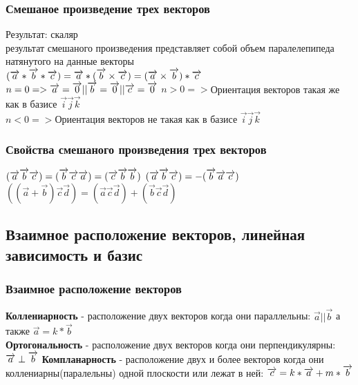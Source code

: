 \documentclass{article}
\begin{document}
\subsubsection{Смешаное произведение трех векторов}
Результат: скаляр\\
результат смешаного произведения представляет собой объем паралелепипеда натянутого на данные векторы\\ 
$(\overrightarrow{a}*\overrightarrow{b}*\overrightarrow{c})=\overrightarrow{a}*(\overrightarrow{b}\times\overrightarrow{c})=(\overrightarrow{a}\times\overrightarrow{b})*\overrightarrow{c}\\$
$n=0 => \overrightarrow{a}=\overrightarrow{0}||\overrightarrow{b}=\overrightarrow{0}||\overrightarrow{c}=\overrightarrow{0}\\$
$n>0 => $Ориентация векторов такая же как в базисе $\overrightarrow{i}\overrightarrow{j}\overrightarrow{k}$\\
$n<0 => $Ориентация векторов не такая как в базисе $\overrightarrow{i}\overrightarrow{j}\overrightarrow{k}$\\
\subsubsection{Свойства смешаного произведения трех векторов}
$(\overrightarrow{a}\overrightarrow{b}\overrightarrow{c})=(\overrightarrow{b}\overrightarrow{c}\overrightarrow{a})=(\overrightarrow{c}\overrightarrow{b}\overrightarrow{b})\\$
$(\overrightarrow{a}\overrightarrow{b}\overrightarrow{c})=-(\overrightarrow{b}\overrightarrow{a}\overrightarrow{c})\\$
$((\overrightarrow{a}+\overrightarrow{b})\overrightarrow{c}\overrightarrow{d})=(\overrightarrow{a}\overrightarrow{c}\overrightarrow{d})+(\overrightarrow{b}\overrightarrow{c}\overrightarrow{d})$
\subsection{Взаимное расположение векторов, линейная зависимость и базис}
\subsubsection{Взаимное расположение векторов}
\textbf{Коллениарность} - расположение двух векторов когда они параллельны: $\overrightarrow{a}||\overrightarrow{b}$ а также $\overrightarrow{a}=k*\overrightarrow{b}$\\
\textbf{Ортогональность} - расположение двух векторов когда они перпендикулярны: $\overrightarrow{a}\perp\overrightarrow{b}\\$
\textbf{Компланарность} - расположение двух и более векторов когда они коллениарны(паралельны) одной плоскости или лежат в ней: $\overrightarrow{c}=k*\overrightarrow{a}+m*\overrightarrow{b}\\$
\end{document}
